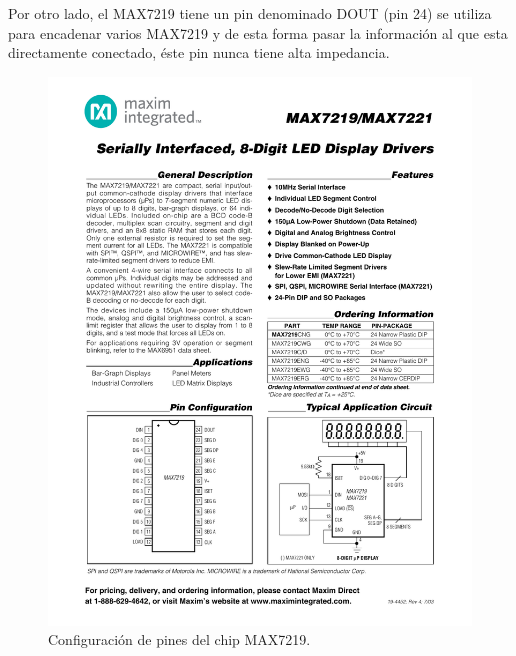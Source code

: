 Por otro lado, el MAX7219 tiene un pin denominado DOUT (pin 24) se utiliza para encadenar varios MAX7219 y de esta forma pasar la información al que esta directamente conectado, éste pin nunca tiene alta impedancia.

\begin{figure}[htp!]
	\centering
	\begin{center}
	\includegraphics[scale=1.2]{imagenes/hw/max.pdf}
	 \caption{Configuración de pines del chip MAX7219.}
	  \label{fig:MAX-pines}
	\end{center}
\end{figure}

